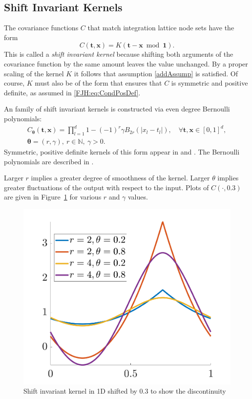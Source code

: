 \documentclass[twocolumn]{svjour3}          %
\newcommand{\bm}[1]{\boldsymbol{#1}}
\newcommand{\naturals}{\mathbb{N}}
\newcommand{\vtheta}{{\bm{\theta}}}
\newcommand{\vt}{\bm{t}}
\newcommand{\vx}{\bm{x}}
\newcommand{\vone}{\bm{1}}
\newcommand\figref{Figure~\ref}
\begin{document}
\subsection{Shift Invariant Kernels}
The covariance functions $C$ that match integration lattice node sets have the form
\begin{equation} \label{eq:shInv}
C(\vt,\vx) = K(\vt - \vx \bmod \vone).
\end{equation}
This is called a \emph{shift invariant kernel} because shifting both arguments of the covariance function by the same amount leaves the value unchanged.   By a proper scaling of the kernel $K$ it follows that assumption \eqref{addAssump} is satisfied. Of course, $K$ must also be of the form that ensures that $C$ is symmetric and positive definite, as assumed in \eqref{FJH:eq:CondPosDef}. 

An family of shift invariant kernels is constructed via even degree Bernoulli polynomials:
\begin{multline}
\label{the_kernel_eqn_bernoulli}
C_\vtheta(\vt, \vx) =
\prod_{l=1}^d
1 - (-1)^{r} \gamma B_{2r}( |{x_l-t_l}| ), \quad  \forall \vt,\vx \in [0,1]^d, \\ \vtheta = (r,\gamma), \ r \in \naturals, \ \gamma > 0.
\end{multline}
Symmetric, positive definite kernels of this form appear in  \cite{DicEtal14a} and \cite{Hic96a}.  The Bernoulli polynomials are described in \cite[Chapter 24]{OlvEtal10a}.

Larger $r$ implies a greater degree of smoothness of the kernel.  Larger $\theta$ implies greater fluctuations of the output with respect to the input.  Plots of $C(\cdot, 0.3)$ are given in \figref{fig:fourierkernel-dim1} for various $r$ and $\gamma$ values.

\begin{figure}
	\centering
	\includegraphics[width=0.9\linewidth]{"figures/fourier_kernel dim_1"}
	\caption[Fourier kernel]{Shift invariant kernel in 1D shifted by 0.3 to show the discontinuity}
	\label{fig:fourierkernel-dim1}
\end{figure}
\end{document}
